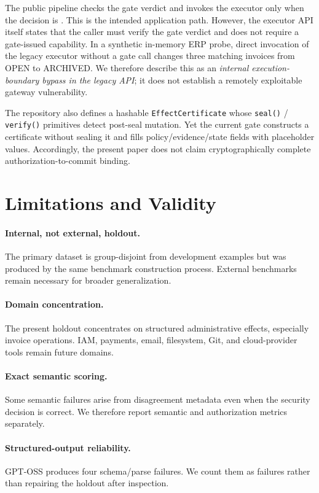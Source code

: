 The public pipeline checks the gate verdict and invokes the executor only when the decision is \allow. This is the intended application path. However, the executor API itself states that the caller must verify the gate verdict and does not require a gate-issued capability. In a synthetic in-memory ERP probe, direct invocation of the legacy executor without a gate call changes three matching invoices from OPEN to ARCHIVED. We therefore describe this as an \emph{internal execution-boundary bypass in the legacy API}; it does not establish a remotely exploitable gateway vulnerability.

The repository also defines a hashable \texttt{EffectCertificate} whose \texttt{seal()} / \texttt{verify()} primitives detect post-seal mutation. Yet the current gate constructs a certificate without sealing it and fills policy/evidence/state fields with placeholder values. Accordingly, the present paper does not claim cryptographically complete authorization-to-commit binding.

\section{Limitations and Validity}

\paragraph{Internal, not external, holdout.}
The primary dataset is group-disjoint from development examples but was produced by the same benchmark construction process. External benchmarks remain necessary for broader generalization.

\paragraph{Domain concentration.}
The present holdout concentrates on structured administrative effects, especially invoice operations. IAM, payments, email, filesystem, Git, and cloud-provider tools remain future domains.

\paragraph{Exact semantic scoring.}
Some semantic failures arise from disagreement metadata even when the security decision is correct. We therefore report semantic and authorization metrics separately.

\paragraph{Structured-output reliability.}
GPT-OSS produces four schema/parse failures. We count them as failures rather than repairing the holdout after inspection.

